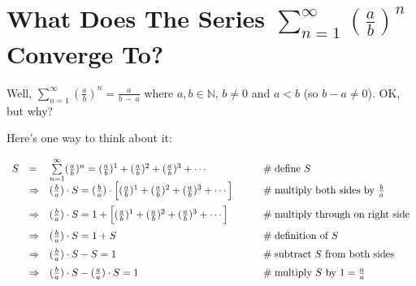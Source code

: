 \documentclass[11pt, oneside]{article}   	%
\begin{document}
\section*{What Does The Series $\sum\limits_{n = 1}^\infty (\frac{a}{b})^n $ Converge To?}

\noindent
Well,  $\sum\limits_{n = 1}^\infty (\frac{a}{b})^n  = \frac{a}{b \:-\: a}$ where $a,b \in \mathbb{N}$, $b \neq 0$ and $a < b$ (so $b - a \neq 0$). OK, but why?

\bigskip
\noindent
 Here's one way to think about it:  
      
\begin{equation*}
\begin{array}{lllll}
S
&=& \sum\limits_{n = 1}^\infty (\frac{a}{b})^n = (\frac{a}{b})^1 + (\frac{a}{b})^2 + (\frac{a}{b})^3 + \cdots                                                                                                                      &\qquad  \mathrel{\#} \text{define $S$}                                          \\ 
\vspace{2.0mm}
&\Rightarrow& (\frac{b}{a}) \cdot S = (\frac{b}{a}) \cdot \Big [(\frac{a}{b})^1 + (\frac{a}{b})^2 + (\frac{a}{b})^3 + \cdots \Big ]   &\qquad  \mathrel{\#} \text{multiply both sides by $\frac{b}{a}$}         \\
\vspace{2.0mm}
&\Rightarrow&  (\frac{b}{a}) \cdot S = 1 + \Big [(\frac{a}{b})^1 + (\frac{a}{b})^2 + (\frac{a}{b})^3 + \cdots \Big ]                        &\qquad  \mathrel{\#} \text{multiply through on right side}                   \\
\vspace{2.0mm}
&\Rightarrow&  (\frac{b}{a}) \cdot S = 1 + S                                                                                                                              &\qquad  \mathrel{\#} \text{definition of $S$}                                         \\
\vspace{2.0mm}
&\Rightarrow&  (\frac{b}{a}) \cdot S - S = 1                                                                                                                               &\qquad  \mathrel{\#} \text{subtract $S$ from both sides}                     \\
\vspace{2.0mm}
&\Rightarrow&  (\frac{b}{a}) \cdot S - (\frac{a}{a}) \cdot S = 1                                                                                                   &\qquad  \mathrel{\#} \text{multiply $S$ by $1 = \frac{a}{a}$}                \\

\end{array}
\end{equation*}
\end{document}
